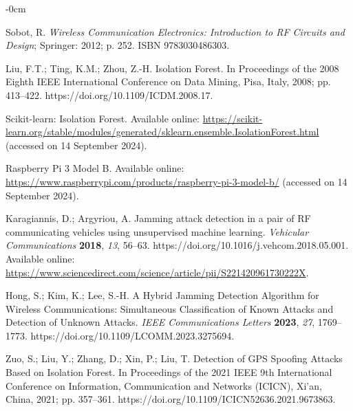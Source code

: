 \documentclass[futureinternet,article,submit,pdftex,moreauthors]{Definitions/mdpi}
\begin{document}
\begin{adjustwidth}{-\extralength}{0cm}
\begin{thebibliography}{999}
Sobot, R. \textit{Wireless Communication Electronics: Introduction to RF Circuits and Design}; Springer: 2012; p. 252. ISBN 9783030486303.

Liu, F.T.; Ting, K.M.; Zhou, Z.-H. Isolation Forest. In Proceedings of the 2008 Eighth IEEE International Conference on Data Mining, Pisa, Italy, 2008; pp. 413--422. https://doi.org/10.1109/ICDM.2008.17.

Scikit-learn: Isolation Forest. Available online: \url{https://scikit-learn.org/stable/modules/generated/sklearn.ensemble.IsolationForest.html} (accessed on 14 September 2024).

Raspberry Pi 3 Model B. Available online: \url{https://www.raspberrypi.com/products/raspberry-pi-3-model-b/} (accessed on 14 September 2024).

Karagiannis, D.; Argyriou, A. Jamming attack detection in a pair of RF communicating vehicles using unsupervised machine learning. {\em Vehicular Communications} {\bf 2018}, {\em 13}, 56--63. https://doi.org/10.1016/j.vehcom.2018.05.001. Available online: \url{https://www.sciencedirect.com/science/article/pii/S221420961730222X}.

Hong, S.; Kim, K.; Lee, S.-H. A Hybrid Jamming Detection Algorithm for Wireless Communications: Simultaneous Classification of Known Attacks and Detection of Unknown Attacks. {\em IEEE Communications Letters} {\bf 2023}, {\em 27}, 1769--1773. https://doi.org/10.1109/LCOMM.2023.3275694.

Zuo, S.; Liu, Y.; Zhang, D.; Xin, P.; Liu, T. Detection of GPS Spoofing Attacks Based on Isolation Forest. In Proceedings of the 2021 IEEE 9th International Conference on Information, Communication and Networks (ICICN), Xi'an, China, 2021; pp. 357--361. https://doi.org/10.1109/ICICN52636.2021.9673863.


\end{thebibliography}

%


\end{adjustwidth}
\end{document}
